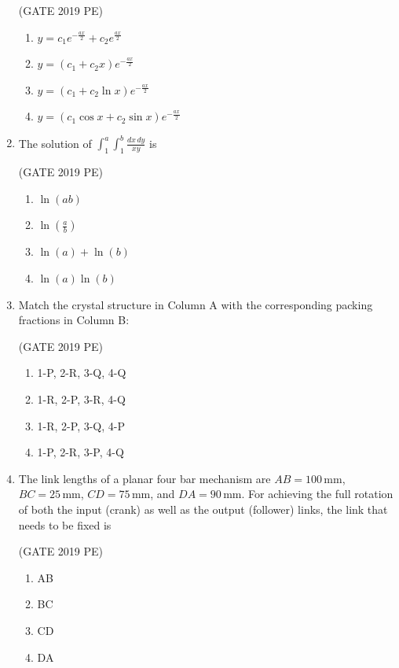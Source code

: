 \documentclass[journal,12pt,onecolumn]{exam}
\theoremstyle{remark}
\begin{document}
\begin{enumerate}
     \hfill{(GATE 2019 PE)}\\
     \begin{enumerate}
         \item  \(y = c_{1} e^{-\frac{ax}{2}} + c_{2} e^{\frac{ax}{2}}\)
         \item \(y = (c_{1} + c_{2} x) e^{-\frac{ax}{2}}\)
         \item \(y = (c_{1} + c_{2} \ln x) e^{-\frac{ax}{2}}\)
         \item \(y = (c_{1} \cos x + c_{2} \sin x) e^{-\frac{ax}{2}}\)
     \end{enumerate}
    
    \item The solution of \(\int_{1}^{a} \int_{1}^{b} \frac{dx\, dy}{xy}\) is

     \hfill{(GATE 2019 PE)}\\
     \begin{enumerate}
         \item  \(\ln(ab)\) 
         \item \(\ln\left(\frac{a}{b}\right)\) 
         \item \(\ln(a) + \ln(b)\)
         \item \(\ln(a) \ln(b)\)
     \end{enumerate}
   
    \item Match the crystal structure in Column A with the corresponding packing fractions in Column B:

 \hfill{(GATE 2019 PE)}\\

 
   \begin{enumerate}
       \item  1-P, 2-R, 3-Q, 4-Q
       \item 1-R, 2-P, 3-R, 4-Q
       \item 1-R, 2-P, 3-Q, 4-P
       \item  1-P, 2-R, 3-P, 4-Q
   \end{enumerate}
    

    \item The link lengths of a planar four bar mechanism are \( AB = 100\, \mathrm{mm} \), \( BC = 25\, \mathrm{mm} \), \( CD = 75\, \mathrm{mm} \), and \( DA = 90\, \mathrm{mm} \). For achieving the full rotation of both the input (crank) as well as the output (follower) links, the link that needs to be fixed is

     \hfill{(GATE 2019 PE)}\\
     \begin{enumerate}
         \item AB
         \item BC
         \item CD
         \item DA
     \end{enumerate}


\end{enumerate}
\end{document}
